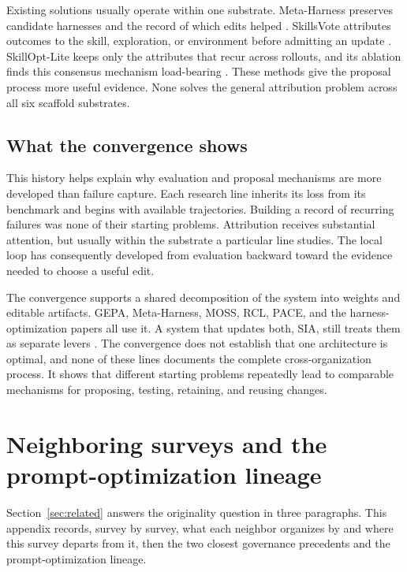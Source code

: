 Existing solutions usually operate within one substrate. Meta-Harness preserves candidate harnesses and the record of which edits helped \citep{lee2026metaharness}. SkillsVote attributes outcomes to the skill, exploration, or environment before admitting an update \citep{liu2026skillsvote}. SkillOpt-Lite keeps only the attributes that recur across rollouts, and its ablation finds this consensus mechanism load-bearing \citep{shen2026skilloptlite}. These methods give the proposal process more useful evidence. None solves the general attribution problem across all six scaffold substrates.

\subsection{What the convergence shows}\label{what-the-convergence-shows}

This history helps explain why evaluation and proposal mechanisms are more developed than failure capture. Each research line inherits its loss from its benchmark and begins with available trajectories. Building a record of recurring failures was none of their starting problems. Attribution receives substantial attention, but usually within the substrate a particular line studies. The local loop has consequently developed from evaluation backward toward the evidence needed to choose a useful edit.

The convergence supports a shared decomposition of the system into weights and editable artifacts. GEPA, Meta-Harness, MOSS, RCL, PACE, and the harness-optimization papers all use it. A system that updates both, SIA, still treats them as separate levers \citep{hebbar2026sia}. The convergence does not establish that one architecture is optimal, and none of these lines documents the complete cross-organization process. It shows that different starting problems repeatedly lead to comparable mechanisms for proposing, testing, retaining, and reusing changes.

\section{Neighboring surveys and the prompt-optimization lineage}\label{app:surveys}

Section~\ref{sec:related} answers the originality question in three paragraphs. This appendix records, survey by survey, what each neighbor organizes by and where this survey departs from it, then the two closest governance precedents and the prompt-optimization lineage.

